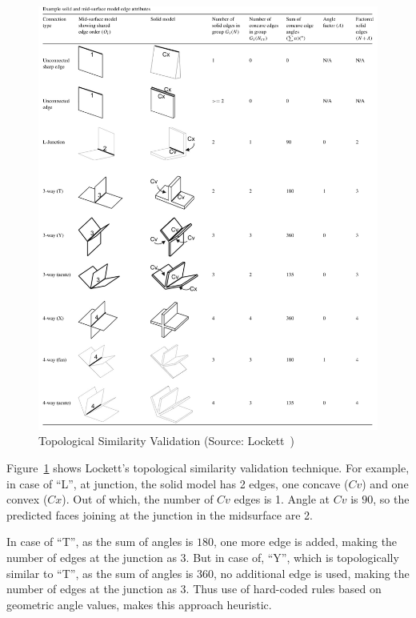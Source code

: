 \begin{figure}[!h]
\centering     %
\includegraphics[width=\linewidth,valign=t]{../Common/images/locketttopoval}
\caption{Topological Similarity Validation (Source: Lockett~\cite{Lockett2008})}
\label{fig:litsurvey:locketttopoval}
\end{figure}


Figure~\ref{fig:litsurvey:locketttopoval} shows Lockett's topological similarity validation technique. For example, in case of ``L'', at junction, the solid model has 2 edges, one concave ($Cv$) and one convex ($Cx$). Out of which, the number of $Cv$ edges is 1. Angle at $Cv$ is $90$, so the predicted faces joining at the junction in the midsurface are 2. 

In case of ``T'', as the sum of angles is $180$, one more edge is added, making the number of edges at the junction as 3. But in case of, ``Y'', which is topologically similar to ``T'', as the sum of angles is $360$, no additional edge is used, making the number of edges at the junction as 3. Thus use of hard-coded rules based on geometric angle values, makes this approach heuristic.

